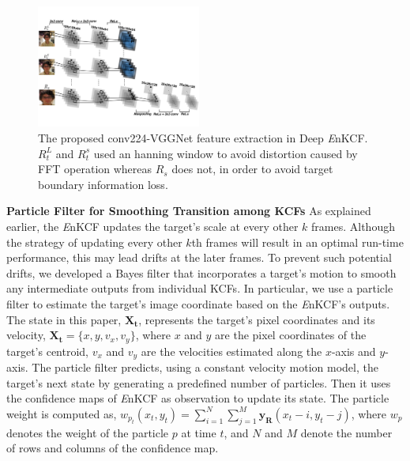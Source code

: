 \documentclass[10pt,twocolumn,letterpaper]{article}
\begin{document}
\begin{figure}[!h]
\centering
\includegraphics[width=0.48\textwidth]{./figures/Filters_Details_CNN.pdf}
\caption{The proposed conv224-VGGNet feature extraction in Deep{\it
    E}nKCF. $R_{t}^{L}$ and $R_{t}^{s}$ used an hanning window to
  avoid distortion caused by FFT operation whereas $R_{s}$ does not,
  in order to avoid target boundary information loss.}
\label{fig:Filters_CNN}
\end{figure}

\textbf{Particle Filter for Smoothing Transition among KCFs} As
explained earlier, the {\it E}nKCF updates the target's scale at every
other $k$ frames. Although the strategy of updating every other $k$th
frames will result in an optimal run-time performance, this may lead
drifts at the later frames. To prevent such potential drifts, we
developed a Bayes filter that incorporates a target's motion to smooth
any intermediate outputs from individual KCFs. In particular, we use a
particle filter to estimate the target's image coordinate based on the
{\it E}nKCF's outputs. The state in this paper, $\mathbf{X_{t}}$,
represents the target's pixel coordinates and its velocity,
$\mathbf{X_{t}} = \lbrace x, y, v_{x}, v_{y} \rbrace$, where $x$ and
$y$ are the pixel coordinates of the target's centroid, $v_x$ and
$v_y$ are the velocities estimated along the $x$-axis and
$y$-axis. The particle filter predicts, using a constant velocity
motion model, the target's next state by generating a predefined
number of particles. Then it uses the confidence maps of {\it E}nKCF
as observation to update its state. The particle weight is computed
as, $w_{p_{t}}(x_{t},y_{t}) = \sum_{i=1}^{N}\sum_{j=1}^{M}
\mathbf{y_{R}}(x_{t}-i,y_{t}-j)$, where $w_{p}$ denotes the weight of
the particle $p$ at time $t$, and $N$ and $M$ denote the number of
rows and columns of the confidence map.
        
\end{document}
